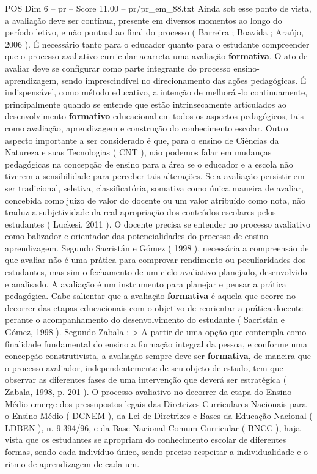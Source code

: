 \begin{textsample}{POS Dim 6 – pr – Score 11.00 – pr/pr\_em\_88.txt}
Ainda sob esse ponto de vista, a avaliação deve ser contínua, presente em diversos momentos ao longo do período letivo, e não pontual ao final do processo ( Barreira ; Boavida ; Araújo, 2006 ).
É necessário tanto para o educador quanto para o estudante compreender que o processo avaliativo curricular acarreta uma avaliação \textbf{formativa}.
O ato de avaliar deve se configurar como parte integrante do processo ensino-aprendizagem, sendo imprescindível no direcionamento das ações pedagógicas.
É indispensável, como método educativo, a intenção de melhorá -lo continuamente, principalmente quando se entende que estão intrinsecamente articulados ao desenvolvimento \textbf{formativo} educacional em todos os aspectos pedagógicos, tais como avaliação, aprendizagem e construção do conhecimento escolar.
Outro aspecto importante a ser considerado é que, para o ensino de Ciências da Natureza e suas Tecnologias ( CNT ), não podemos falar em mudanças pedagógicas na concepção de ensino para a área se o educador e a escola não tiverem a sensibilidade para perceber tais alterações.
Se a avaliação persistir em ser tradicional, seletiva, classificatória, somativa como única maneira de avaliar, concebida como juízo de valor do docente ou um valor atribuído como nota, não traduz a subjetividade da real apropriação dos conteúdos escolares pelos estudantes ( Luckesi, 2011 ).
O docente precisa se entender no processo avaliativo como balizador e orientador das potencialidades do processo de ensino-aprendizagem.
Segundo Sacristán e Gómez ( 1998 ), necessária a compreensão de que avaliar não é uma prática para comprovar rendimento ou peculiaridades dos estudantes, mas sim o fechamento de um ciclo avaliativo planejado, desenvolvido e analisado.
A avaliação é um instrumento para planejar e pensar a prática pedagógica.
Cabe salientar que a avaliação \textbf{formativa} é aquela que ocorre no decorrer das etapas educacionais com o objetivo de reorientar a prática docente perante o acompanhamento do desenvolvimento do estudante ( Sacristán e Gómez, 1998 ).
Segundo Zabala : > A partir de uma opção que contempla como finalidade fundamental do ensino a formação integral da pessoa, e conforme uma concepção construtivista, a avaliação sempre deve ser \textbf{formativa}, de maneira que o processo avaliador, independentemente de seu objeto de estudo, tem que observar as diferentes fases de uma intervenção que deverá ser estratégica ( Zabala, 1998, p. 201 ).
O processo avaliativo no decorrer da etapa do Ensino Médio emerge dos pressupostos legais das Diretrizes Curriculares Nacionais para o Ensino Médio ( DCNEM ), da Lei de Diretrizes e Bases da Educação Nacional ( LDBEN ), n. 9.394/96, e da Base Nacional Comum Curricular ( BNCC ), haja vista que os estudantes se apropriam do conhecimento escolar de diferentes formas, sendo cada indivíduo único, sendo preciso respeitar a individualidade e o ritmo de aprendizagem de cada um.

\end{textsample}
